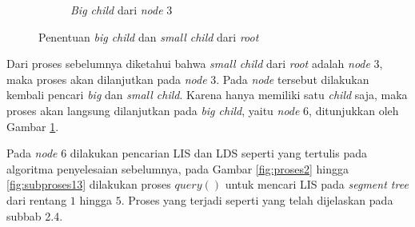 \begin{figure}[H]
\begin{subfigure}{.5\textwidth}
		\caption{\textit{Big child} dari \textit{node} 3}
		\label{fig:subproses4}
	\end{subfigure}
	\caption{Penentuan \textit{big child} dan \textit{small child} dari \textit{root}}
	\label{fig:proses1}
\end{figure}

\quad Dari proses sebelumnya diketahui bahwa \textit{small child} dari \textit{root} adalah \textit{node} 3, maka proses akan dilanjutkan pada \textit{node} 3. Pada \textit{node} tersebut dilakukan kembali pencari \textit{big} dan \textit{small child}. Karena hanya memiliki satu \textit{child} saja, maka proses akan langsung dilanjutkan pada \textit{big child}, yaitu \textit{node} 6, ditunjukkan oleh Gambar \ref{fig:subproses4}. 

\quad Pada \textit{node} 6 dilakukan pencarian LIS dan LDS seperti yang tertulis pada algoritma penyelesaian sebelumnya, pada Gambar \ref{fig:proses2} hingga \ref{fig:subproses13} dilakukan proses \textit{$query()$} untuk mencari LIS pada \textit{segment tree} dari rentang $1$ hingga $5$. Proses yang terjadi seperti yang telah dijelaskan pada subbab 2.4.
